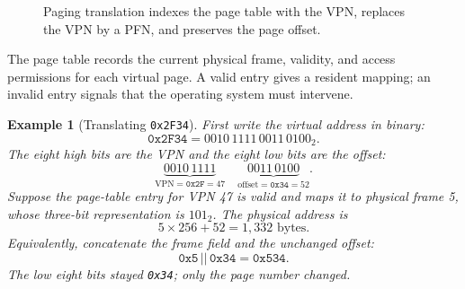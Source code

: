 \documentclass[11pt]{article}
\newtheorem{example}{Example}[section]
\begin{document}
\begin{figure}[h]
  \centering
  \caption{Paging translation indexes the page table with the VPN, replaces
  the VPN by a PFN, and preserves the page offset.}
  \label{fig:paging}
\end{figure}

The page table records the current physical frame, validity, and access
permissions for each virtual page. A valid entry gives a resident mapping; an
invalid entry signals that the operating system must intervene.

\begin{example}[Translating \texttt{0x2F34}]
\label{ex:translation}
First write the virtual address in binary:
\[
  \texttt{0x2F34}=0010\,1111\,0011\,0100_2.
\]
The eight high bits are the VPN and the eight low bits are the offset:
\[
  \underbrace{0010\,1111}_{\mathrm{VPN}=\texttt{0x2F}=47}\quad
  \underbrace{0011\,0100}_{\mathrm{offset}=\texttt{0x34}=52}.
\]
Suppose the page-table entry for VPN 47 is valid and maps it to physical frame
5, whose three-bit representation is $101_2$. The physical address is
\[
  5\times256+52=1{,}332\text{ bytes}.
\]
Equivalently, concatenate the frame field and the unchanged offset:
\[
  \texttt{0x5}\,||\,\texttt{0x34}=\texttt{0x534}.
\]
The low eight bits stayed \texttt{0x34}; only the page number changed.
\end{example}
\end{document}
